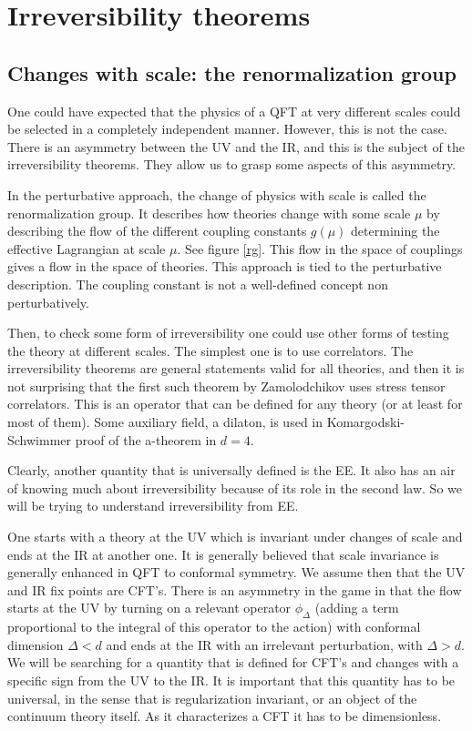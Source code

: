 \documentclass[12pt]{article}
\numberwithin{equation}{section}
\begin{document}
\newpage
 
\section{Irreversibility theorems}

\subsection{Changes with scale: the renormalization group}
One could have expected that the physics of a QFT at very different scales could be selected in a completely independent manner. However, this is not the case. There is an asymmetry between the UV and the IR, and this is the subject of the irreversibility theorems. They allow us to grasp some aspects of this asymmetry. 

In the perturbative approach, the change of physics with scale is called the renormalization group. It describes how theories change with some scale $\mu$ by describing the flow of the different coupling constants $g(\mu)$ determining the effective Lagrangian at scale $\mu$. See figure \ref{rg}. This flow in the space of couplings gives a flow in the space of theories. 
 This approach is tied to the perturbative description. The coupling constant is not a well-defined concept non perturbatively. 

Then, to check some form of irreversibility one could use other forms of testing the theory at different scales. The simplest one is to use correlators. The irreversibility theorems are general statements valid for all theories, and then it is not surprising that the first such theorem by Zamolodchikov uses stress tensor correlators.  This is an operator that can be defined for any theory (or at least for most of them). Some auxiliary field, a dilaton, is used in Komargodski-Schwimmer proof of the a-theorem in $d=4$.

Clearly, another quantity that is universally defined is the EE. It also has an air of knowing much about irreversibility because of its role in the second law. So we will be trying to understand irreversibility from EE.
  
One starts with a theory at the UV which is invariant under changes of scale and ends at the IR at another one. It is generally believed that scale invariance is generally enhanced in QFT to conformal symmetry. We assume then that the UV and IR fix points are CFT's. There is an asymmetry in the game in that the flow starts at the UV by turning on a relevant operator $\phi_\Delta$ (adding a term proportional to the integral of this operator to the action) with conformal dimension $\Delta< d$ and ends at the IR with an irrelevant perturbation, with $\Delta>d$. 
We will be searching for a quantity that is defined for CFT's and changes with a specific sign from the UV to the IR. It is important that this quantity has to be universal, in the sense that is regularization invariant, or an object of the continuum theory itself. As it characterizes a CFT it has to be dimensionless.   
\end{document}
